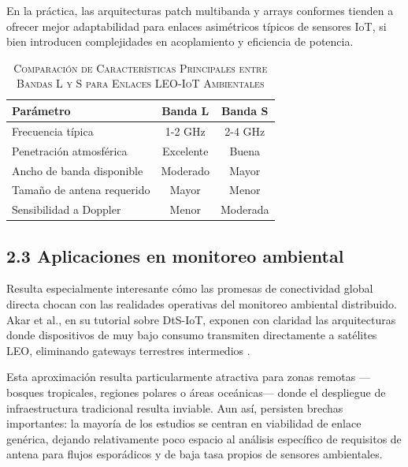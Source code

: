 En la práctica, las arquitecturas patch multibanda y arrays conformes tienden a ofrecer mejor adaptabilidad para enlaces asimétricos típicos de sensores IoT, si bien introducen complejidades en acoplamiento y eficiencia de potencia.


\begin{table}[htbp]
\renewcommand{\arraystretch}{1.3} %
\centering
\caption{\textsc{Comparación de Características Principales entre Bandas L y S para Enlaces LEO-IoT Ambientales}}
\label{tab:comparacion_bandas_leo}
\begin{tabularx}{\columnwidth}{|X|c|c|}
\hline
\textbf{Parámetro} & \textbf{Banda L} & \textbf{Banda S} \\ \hline
Frecuencia típica & 1-2 GHz & 2-4 GHz \\ \hline
Penetración atmosférica & Excelente & Buena \\ \hline
Ancho de banda disponible & Moderado & Mayor \\ \hline
Tamaño de antena requerido & Mayor & Menor \\ \hline
Sensibilidad a Doppler & Menor & Moderada \\ \hline
\end{tabularx}
\end{table}

\subsection{2.3 Aplicaciones en monitoreo ambiental}

Resulta especialmente interesante cómo las promesas de conectividad global directa chocan con las realidades operativas del monitoreo ambiental distribuido. Akar et al., en su tutorial sobre DtS-IoT, exponen con claridad las arquitecturas donde dispositivos de muy bajo consumo transmiten directamente a satélites LEO, eliminando gateways terrestres intermedios \cite{Akar2026}. 

Esta aproximación resulta particularmente atractiva para zonas remotas —bosques tropicales, regiones polares o áreas oceánicas— donde el despliegue de infraestructura tradicional resulta inviable. Aun así, persisten brechas importantes: la mayoría de los estudios se centran en viabilidad de enlace genérica, dejando relativamente poco espacio al análisis específico de requisitos de antena para flujos esporádicos y de baja tasa propios de sensores ambientales.

